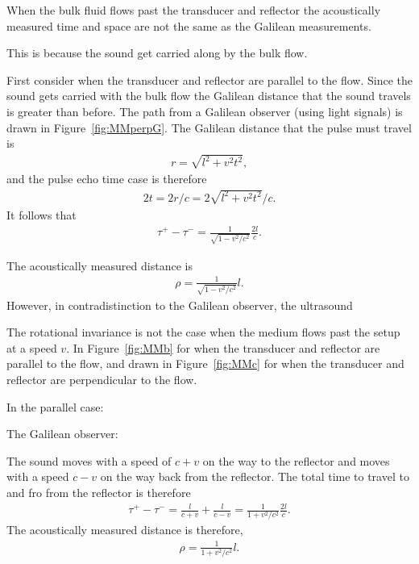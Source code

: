 \documentclass[10pt, fleqn,draft,showtrims,oldfontcommands]{article} %
\newcommand{\figref}[1]{Figure~\ref{fig:#1}}
\newcommand{\tm}{\tau^-}
\newcommand{\tp}{\tau^+}
\begin{document}
When  the bulk fluid flows past the transducer and reflector the acoustically measured time and 
space are not the same as the Galilean measurements.

This is because the sound get carried along by the bulk flow.

First consider when the transducer and reflector are parallel to the flow.
Since the sound gets carried with the bulk flow the Galilean distance that the sound travels is greater than before.
The path from a Galilean observer (using light signals) is drawn in \figref{MMperpG}.
The  Galilean distance that the pulse must travel is
\begin{align}
 r =  \sqrt{l^2 + v^2t^2},
\end{align}
and the pulse echo time case is therefore
\begin{align}
 2t = 2r/c =   2\sqrt{l^2 + v^2t^2}/c.
\end{align}
It follows that 
\begin{align}
   \tp-\tm = \frac{1}{\sqrt{1-v^2/c^2}} \frac{2l}{c}.
\end{align}

The acoustically measured distance is
\begin{align}
  \rho =  \frac{1}{\sqrt{1-v^2/c^2}} l.
\end{align}
However, in contradistinction to the Galilean observer, the ultrasound 


The rotational invariance is not the case when the medium flows past the setup at a speed $v$.
In \figref{MMb} for when the transducer and reflector are parallel to the flow,
and drawn in \figref{MMc} for when the transducer and reflector are perpendicular to the flow.


In the parallel case:

The Galilean observer:

The sound moves with a speed of $c+v$ on the way to the reflector and moves with a speed $c-v$ on the way back from the reflector.
The total time to travel to and fro from the reflector is therefore
\begin{align}
  \tp-\tm = \frac{l}{c+v} + \frac{l}{c-v} = \frac{1}{1+v^2/c^2} \frac{2l}{c}.
\end{align}
The acoustically measured distance is therefore,
\begin{align}
  \rho = \frac{1}{1+v^2/c^2} l.
\end{align}
\end{document}
